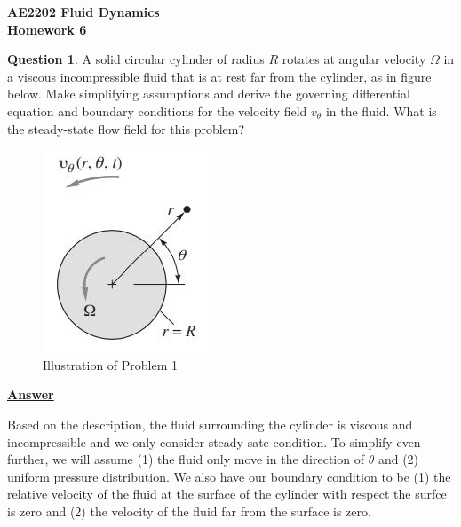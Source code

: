 \documentclass{article}
\begin{document}

\begin{center}
    \textbf{AE2202 Fluid Dynamics} \\
    \textbf{Homework 6}
\end{center}

\hfill

\textbf{Question 1}. A solid circular cylinder of radius $R$ rotates at angular velocity $\Omega$ in a viscous incompressible fluid that is at rest far from the cylinder, as in figure below. Make simplifying assumptions and derive the governing differential equation and boundary conditions for the velocity field $v_\theta$ in the fluid. What is the steady-state flow field for this problem?

\begin{figure}[h]
    \centering
    \includegraphics{Problem1.jpg}
    \caption{Illustration of Problem 1}
    \label{fig:figprob1}
\end{figure}

\textbf{\underline{Answer}}

Based on the description, the fluid surrounding the cylinder is viscous and incompressible and we only consider steady-sate condition. To simplify even further, we will assume (1) the fluid only move in the direction of $\theta$ and (2) uniform pressure distribution. We also have our boundary condition to be (1) the relative velocity of the fluid at the surface of the cylinder with respect the surfce is zero and (2) the velocity of the fluid far from the surface is zero.
\end{document}
